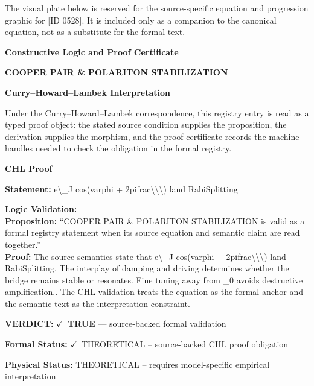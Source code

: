 \begingroup\footnotesize\sloppy
The visual plate below is reserved for the source-specific equation and progression graphic for [ID 0528]. It is included only as a companion to the canonical equation, not as a substitute for the formal text.
\par\endgroup
\ifTZPDarkEdition
{}
\fi

\clearpage
\begingroup\tzpsupportsetup
\noindent\textbf{\fontsize{10.8pt}{12.8pt}\selectfont [ID 0528] Constructive Logic and Proof Certificate}\par
\noindent\textbf{\fontsize{10pt}{12pt}\selectfont COOPER PAIR \& POLARITON STABILIZATION}\par
\vspace{0.45em}
\begingroup
\footnotesize
\setlength{\parskip}{0.22em}
\setlength{\parindent}{0pt}
\noindent\textbf{Curry--Howard--Lambek Interpretation}\par
Under the Curry--Howard--Lambek correspondence, this registry entry is read as a typed proof
object: the stated source condition supplies the proposition, the derivation supplies the
morphism, and the proof certificate records the machine handles needed to check the obligation
in the formal registry.

\vspace{0.45em}
\noindent\textbf{CHL Proof}\par
\textbf{Statement:} e\textbackslash{}\_J cos(varphi + 2pifrac\textbackslash{}\textbackslash{}\textbackslash{}) land RabiSplitting

\textbf{Logic Validation:}\\
\textbf{Proposition:} ``COOPER PAIR \& POLARITON STABILIZATION is valid as a formal registry statement when its
source equation and semantic claim are read together.''\\
\textbf{Proof:} The source semantics state that e\textbackslash{}\_J cos(varphi + 2pifrac\textbackslash{}\textbackslash{}\textbackslash{}) land RabiSplitting. The
interplay of damping and driving determines whether the bridge remains stable or
resonates. Fine tuning  away from \_0 avoids destructive amplification.. The CHL
validation treats the equation as the formal anchor and the semantic text as the
interpretation constraint.

\textbf{VERDICT:} \ensuremath{\checkmark}\ \textbf{TRUE} --- source-backed formal validation

\textbf{Formal Status:} \ensuremath{\checkmark}\ THEORETICAL -- source-backed CHL proof obligation

\textbf{Physical Status:} THEORETICAL -- requires model-specific empirical interpretation
\par\vspace{0.45em}
\par
\ifTZPDarkEdition
{}
\fi
\endgroup
\endgroup
